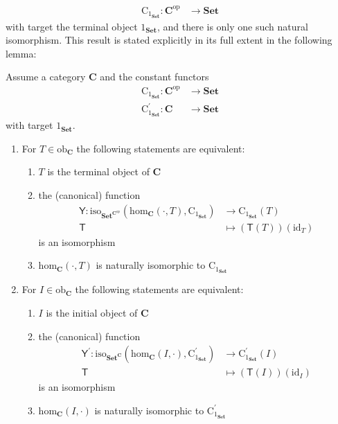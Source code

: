 \begin{align*}
  \mathrm{C}_{1_{\mathbf{Set}}}
  \colon
  \mathbf{C}^{\mathrm{op}}
  &\rightarrow
  \mathbf{Set}
\end{align*}
with target the terminal object $1_{\mathbf{Set}}$, and there is only one such natural isomorphism.
This result is stated explicitly in its full extent in the following lemma:
\\
\begin{lem}
\label{lem:repuniob}
Assume a category $\mathbf{C}$ and the constant functors
\begin{align*}
  \mathrm{C}_{1_{\mathbf{Set}}}
  \colon
  \mathbf{C}^{\mathrm{op}}
  &\rightarrow
  \mathbf{Set}
  \\
  \mathrm{C}_{1_{\mathbf{Set}}}^{\prime}
  \colon
  \mathbf{C}
  &\rightarrow
  \mathbf{Set}
\end{align*}
with target $1_{\mathbf{Set}}$.
\begin{enumerate}
\item[(1T)]
For $T \in \mathrm{ob}_{\mathbf{C}}$ the following statements are equivalent:
\begin{enumerate}
\item[(a)]
$T$ is the terminal object of $\mathbf{C}$
\item[(b)]
the (canonical) function
\begin{align*}
  \mathsf{Y}
  \colon
  \mathrm{iso}_{\mathbf{Set}^{\mathbf{C}^{\mathrm{op}}}}
  \left(
    \mathrm{hom}_{\mathbf{C}}(\cdot,T),
    \mathrm{C}_{1_{\mathbf{Set}}}
  \right)
  &\rightarrow
  \mathrm{C}_{1_{\mathbf{Set}}}(T)
  \\
  \mathsf{T}
  &\mapsto
  (\mathsf{T}(T))(\mathrm{id}_{T})
\end{align*}
is an isomorphism
\item[(c)]
$\mathrm{hom}_{\mathbf{C}}(\cdot,T)$ is naturally isomorphic to $\mathrm{C}_{1_{\mathbf{Set}}}$
\end{enumerate}
\item[(1I)]
For $I \in \mathrm{ob}_{\mathbf{C}}$ the following statements are equivalent:
\begin{enumerate}
\item[(a)]
$I$ is the initial object of $\mathbf{C}$
\item[(b)]
the (canonical) function
\begin{align*}
  \mathsf{Y}^{\prime}
  \colon
  \mathrm{iso}_{\mathbf{Set}^{\mathbf{C}}}
  \left(
    \mathrm{hom}_{\mathbf{C}}(I,\cdot),
    \mathrm{C}_{1_{\mathbf{Set}}}^{\prime}
  \right)
  &\rightarrow
  \mathrm{C}_{1_{\mathbf{Set}}}^{\prime}(I)
  \\
  \mathsf{T}
  &\mapsto
  (\mathsf{T}(I))(\mathrm{id}_{I})
\end{align*}
is an isomorphism
\item[(c)]
$\mathrm{hom}_{\mathbf{C}}(I,\cdot)$ is naturally isomorphic to $\mathrm{C}_{1_{\mathbf{Set}}}^{\prime}$
\end{enumerate}
\end{enumerate}
\end{lem}

